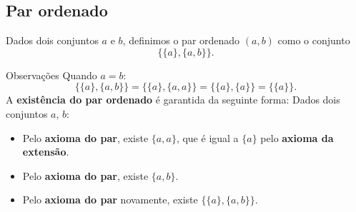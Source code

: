    \subsection{Par ordenado} 
      \begin{definition}
         Dados dois conjuntos $a$ e $b$, definimos o par ordenado $( a ,b)$ como o conjunto 
         $$\{\{a\},\{a, b\}\}.$$
      \end{definition}
      \begin{mymdframed}{Observações}
         Quando $a = b$:
         $$\{\{a\},\{a, b\}\} = \{\{a\},\{a, a\}\} = \{\{a\},\{a\}\} = \{\{a\}\}.$$
         A \textbf{existência do par ordenado} é garantida da seguinte forma:
         Dados dois conjuntos $a$, $b$: 
         \begin{itemize}      
            \item Pelo \textbf{axioma do par}, existe $\{a, a\}$, que é igual a $\{a\}$ pelo \textbf{axioma da extensão}.
            \item Pelo \textbf{axioma do par}, existe $\{a, b\}.$
            \item Pelo \textbf{axioma do par} novamente, existe $\{\{a\},\{a, b\}\}.$      
         \end{itemize}
      \end{mymdframed}
